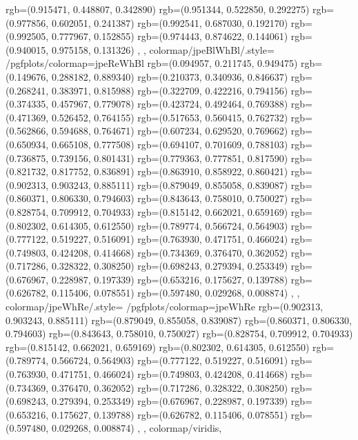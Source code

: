 {{{      rgb=(0.915471, 0.448807, 0.342890)
      rgb=(0.951344, 0.522850, 0.292275)
      rgb=(0.977856, 0.602051, 0.241387)
      rgb=(0.992541, 0.687030, 0.192170)
      rgb=(0.992505, 0.777967, 0.152855)
      rgb=(0.974443, 0.874622, 0.144061)
      rgb=(0.940015, 0.975158, 0.131326)
    },
  },
  colormap/jpeBlWhBl/.style={%
    /pgfplots/colormap={jpeReWhBl}{%
      rgb=(0.094957, 0.211745, 0.949475)
      rgb=(0.149676, 0.288182, 0.889340)
      rgb=(0.210373, 0.340936, 0.846637)
      rgb=(0.268241, 0.383971, 0.815988)
      rgb=(0.322709, 0.422216, 0.794156)
      rgb=(0.374335, 0.457967, 0.779078)
      rgb=(0.423724, 0.492464, 0.769388)
      rgb=(0.471369, 0.526452, 0.764155)
      rgb=(0.517653, 0.560415, 0.762732)
      rgb=(0.562866, 0.594688, 0.764671)
      rgb=(0.607234, 0.629520, 0.769662)
      rgb=(0.650934, 0.665108, 0.777508)
      rgb=(0.694107, 0.701609, 0.788103)
      rgb=(0.736875, 0.739156, 0.801431)
      rgb=(0.779363, 0.777851, 0.817590)
      rgb=(0.821732, 0.817752, 0.836891)
      rgb=(0.863910, 0.858922, 0.860421)
      rgb=(0.902313, 0.903243, 0.885111)
      rgb=(0.879049, 0.855058, 0.839087)
      rgb=(0.860371, 0.806330, 0.794603)
      rgb=(0.843643, 0.758010, 0.750027)
      rgb=(0.828754, 0.709912, 0.704933)
      rgb=(0.815142, 0.662021, 0.659169)
      rgb=(0.802302, 0.614305, 0.612550)
      rgb=(0.789774, 0.566724, 0.564903)
      rgb=(0.777122, 0.519227, 0.516091)
      rgb=(0.763930, 0.471751, 0.466024)
      rgb=(0.749803, 0.424208, 0.414668)
      rgb=(0.734369, 0.376470, 0.362052)
      rgb=(0.717286, 0.328322, 0.308250)
      rgb=(0.698243, 0.279394, 0.253349)
      rgb=(0.676967, 0.228987, 0.197339)
      rgb=(0.653216, 0.175627, 0.139788)
      rgb=(0.626782, 0.115406, 0.078551)
      rgb=(0.597480, 0.029268, 0.008874)
    },
  },
  colormap/jpeWhRe/.style={%
    /pgfplots/colormap={jpeWhRe}{%
      rgb=(0.902313, 0.903243, 0.885111)
      rgb=(0.879049, 0.855058, 0.839087)
      rgb=(0.860371, 0.806330, 0.794603)
      rgb=(0.843643, 0.758010, 0.750027)
      rgb=(0.828754, 0.709912, 0.704933)
      rgb=(0.815142, 0.662021, 0.659169)
      rgb=(0.802302, 0.614305, 0.612550)
      rgb=(0.789774, 0.566724, 0.564903)
      rgb=(0.777122, 0.519227, 0.516091)
      rgb=(0.763930, 0.471751, 0.466024)
      rgb=(0.749803, 0.424208, 0.414668)
      rgb=(0.734369, 0.376470, 0.362052)
      rgb=(0.717286, 0.328322, 0.308250)
      rgb=(0.698243, 0.279394, 0.253349)
      rgb=(0.676967, 0.228987, 0.197339)
      rgb=(0.653216, 0.175627, 0.139788)
      rgb=(0.626782, 0.115406, 0.078551)
      rgb=(0.597480, 0.029268, 0.008874)
    },
  },
  colormap/viridis,
}

